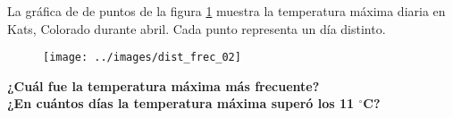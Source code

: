 La gráfica de de puntos de la figura \ref{fig:dist_frec_02} muestra la temperatura máxima diaria en Kats, Colorado durante abril.
Cada punto representa un día distinto.
\begin{figure}[H]
    \begin{center}
        \texttt{[image: ../images/dist\_frec\_02]}
    \end{center}
    \caption{}
    \label{fig:dist_frec_02}
\end{figure}
\textbf{¿Cuál fue la temperatura máxima más frecuente?} \\
\textbf{¿En cu\'antos d\'ias la temperatura m\'axima super\'o los 11 $^\circ$C?}